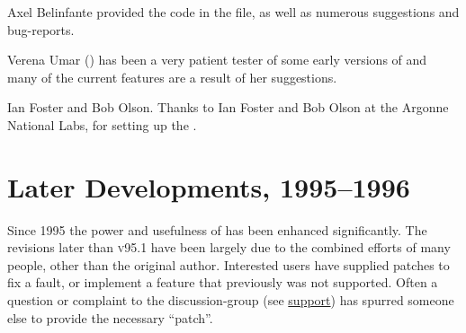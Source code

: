 \begin{htmllist}
\item [Axel Belinfante] 
provided the \Perl{} code in the  file,
as well as numerous suggestions and bug-reports.

\item
[Verena Umar]  (\CSEP)
has been a very patient tester of some early versions of \latextohtml{}
and many of the current features are a result of her suggestions.

%

\item [Ian Foster and Bob Olson.]
Thanks to Ian Foster 
and Bob Olson 
at the Argonne National Labs, for setting up the \maillist.
\end{htmllist}


\clearpage
\section*{Later Developments, 1995--1996\label{recent96}}%
%
Since 1995 the power and usefulness of \latextohtml{} has been enhanced significantly.
The revisions later than \textsc{v95.1} have been largely due
to the combined efforts of many people, other than the original author.
Interested users have supplied patches to fix a fault,
or implement a feature that previously was not supported.
Often a question or complaint to the discussion-group
(see \hyperref{Getting Support ...}{Section~}{}{support})
has spurred someone else to provide the necessary ``patch''.%

